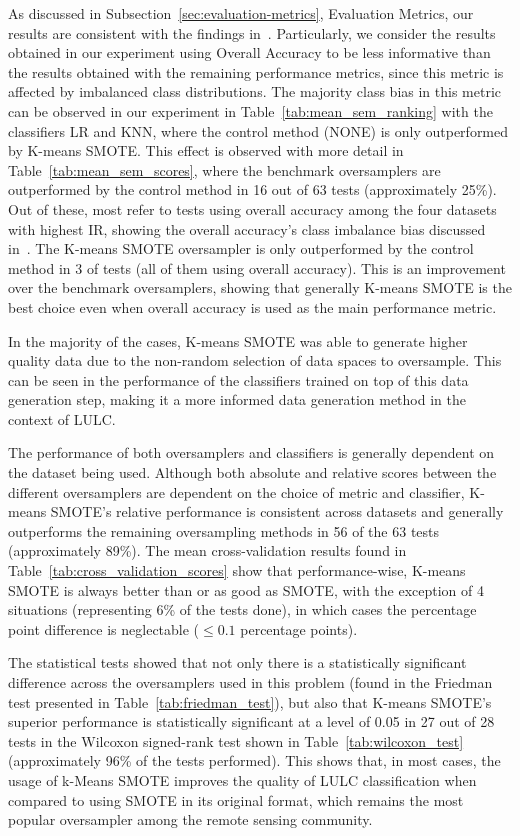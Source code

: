 \documentclass[information,article,submit,moreauthors,pdftex]{Definitions/mdpi}
\begin{document}
\begin{paracol}{2}
As discussed in Subsection~\ref{sec:evaluation-metrics}, Evaluation Metrics,
our results are consistent with the findings in~\citep{Olofsson2013,
Pontius2011}. Particularly, we consider the results obtained in our experiment
using Overall Accuracy to be less informative than the results obtained with
the remaining performance metrics, since this metric is affected by imbalanced
class distributions. The majority class bias in this metric can be observed
in our experiment in Table~\ref{tab:mean_sem_ranking} with the classifiers LR
and KNN, where the control method (NONE) is only outperformed by K-means
SMOTE. This effect is observed with more detail in
Table~\ref{tab:mean_sem_scores}, where the benchmark oversamplers are
outperformed by the control method in 16 out of 63 tests (approximately 25\%).
Out of these, most refer to tests using overall accuracy among the four
datasets with highest IR, showing the overall accuracy's class imbalance bias
discussed in~\citep{Olofsson2013, Pontius2011}. The K-means SMOTE oversampler
is only outperformed by the control method in 3 of tests (all of them using
overall accuracy). This is an improvement over the benchmark oversamplers,
showing that generally K-means SMOTE is the best choice even when overall
accuracy is used as the main performance metric.

In the majority of the cases, K-means SMOTE was able to generate higher
quality data due to the non-random selection of data spaces to oversample.
This can be seen in the performance of the classifiers trained on top of this
data generation step, making it a more informed data generation method in the
context of LULC\@.

The performance of both oversamplers and classifiers is generally dependent on
the dataset being used. Although both absolute and relative scores between the
different oversamplers are dependent on the choice of metric and classifier,
K-means SMOTE's relative performance is consistent across datasets and
generally outperforms the remaining oversampling methods in 56 of the 63 tests
(approximately 89\%). The mean cross-validation results found in
Table~\ref{tab:cross_validation_scores} show that performance-wise, K-means
SMOTE is always better than or as good as SMOTE, with the exception of 4
situations (representing 6\% of the tests done), in which cases the percentage
point difference is neglectable ($\leq 0.1$ percentage points). 

The statistical tests showed that not only there is a statistically
significant difference across the oversamplers used in this problem (found in
the Friedman test presented in Table~\ref{tab:friedman_test}), but also that
K-means SMOTE's superior performance is statistically significant at a level
of 0.05 in 27 out of 28 tests in the Wilcoxon signed-rank test shown in
Table~\ref{tab:wilcoxon_test} (approximately 96\% of the tests performed).
This shows that, in most cases, the usage of k-Means SMOTE improves the
quality of LULC classification when compared to using SMOTE in its original
format, which remains the most popular oversampler among the remote sensing
community.


\end{paracol}
\end{document}
